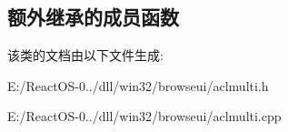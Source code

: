\subsection*{额外继承的成员函数}


该类的文档由以下文件生成\+:\begin{DoxyCompactItemize}
\item 
E\+:/\+React\+O\+S-\/0../dll/win32/browseui/aclmulti.\+h\item 
E\+:/\+React\+O\+S-\/0../dll/win32/browseui/aclmulti.\+cpp\end{DoxyCompactItemize}
